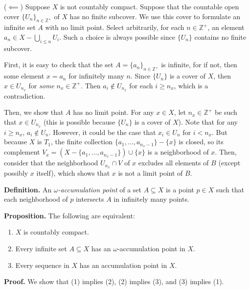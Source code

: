 \documentclass[12pt]{article}
\begin{document}
($\impliedby$) Suppose $X$ is not countably compact. Suppose that the countable open cover $\{ U_n \}_{n \in \mathbb{Z}^+}$ of $X$ has no finite subcover. We use this cover to formulate an infinite set $A$ with no limit point. Select arbitrarily, for each $n \in \mathbb{Z}^+$, an element $a_n \in X - \bigcup_{i \le n} U_i$. Such a choice is always possible since $\{ U_n \}$ contains no finite subcover.

First, it is easy to check that the set $A = \{ a_n \}_{n \in \mathbb{Z}^+}$ is infinite, for if not, then some element $x = a_n$ for infinitely many $n$. Since $\{ U_n \}$ is a cover of $X$, then $x \in U_{n_x}$ for \emph{some} $n_x \in \mathbb{Z}^+$. Then $a_i \notin U_{n_x}$ for each $i \ge n_x$, which is a contradiction.

Then, we show that $A$ has no limit point. For any $x \in X$, let $n_x \in \mathbb{Z}^+$ be such that $x \in U_{n_x}$ (this is possible because $\{ U_n \}$ is a cover of $X$). Note that for any $i \ge n_x$, $a_i \notin U_n$. However, it could be the case that $x_i \in U_n$ for $i < n_x$. But because $X$ is $T_1$, the finite collection $\{ a_1, \dots, a_{n_x - 1} \} - \{ x \}$ is closed, so its complement $V_x = (X - \{ a_1, \dots, a_{n_x - 1} \}) \cup \{ x \}$ is a neighborhood of $x$. Then, consider that the neighborhood $U_{n_x} \cap V$ of $x$ excludes all elements of $B$ (except possibly $x$ itself), which shows that $x$ is not a limit point of $B$.


\vspace{2 \baselineskip}


\textbf{Definition. } An \emph{$\omega$-accumulation point} of a set $A \subseteq X$ is a point $p \in X$ such that each neighborhood of $p$ intersects $A$ in infinitely many points.

\vspace{1 \baselineskip}

\textbf{Proposition. } The following are equivalent:

\begin{enumerate}
\item $X$ is countably compact.
\item Every infinite set $A \subseteq X$ has an $\omega$-accumulation point in $X$.
\item Every sequence in $X$ has an accumulation point in $X$.
\end{enumerate}

\textbf{Proof. } We show that (1) implies (2), (2) implies (3), and (3) implies (1).
\end{document}
